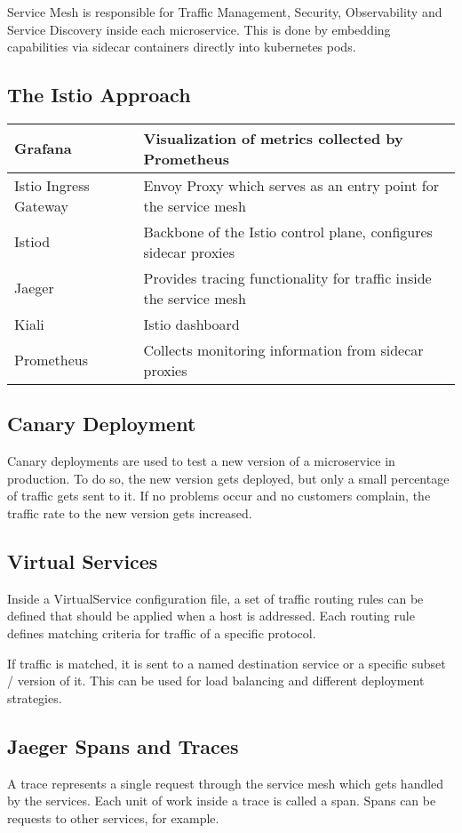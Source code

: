 Service Mesh is responsible for Traffic Management, Security, Observability and Service Discovery inside each microservice.
This is done by embedding capabilities via sidecar containers directly into kubernetes pods.

\subsection{The Istio Approach}
\renewcommand{\arraystretch}{1.5}
\begin{center}
    \begin{tabular}{l|l}
        Grafana & Visualization of metrics collected by Prometheus \\
        \hline
        Istio Ingress Gateway & Envoy Proxy which serves as an entry point for the service mesh \\
        \hline
        Istiod & Backbone of the Istio control plane, configures sidecar proxies \\
        \hline
        Jaeger & Provides tracing functionality for traffic inside the service mesh \\
        \hline
        Kiali & Istio dashboard \\ 
        \hline
        Prometheus & Collects monitoring information from sidecar proxies \\
    \end{tabular}
\end{center}

\subsection{Canary Deployment}
Canary deployments are used to test a new version of a microservice in production. To do so, the new version gets deployed, but only a small percentage of traffic gets sent to it. 
If no problems occur and no customers complain, the traffic rate to the new version gets increased. 

\subsection{Virtual Services}
Inside a VirtualService configuration file, a set of traffic routing rules can be defined that should be applied when a host is addressed. 
Each routing rule defines matching criteria for traffic of a specific protocol.

If traffic is matched, it is sent to a named destination service or a specific subset / version of it. This can be used for load balancing and different deployment strategies.

\subsection{Jaeger Spans and Traces}
A trace represents a single request through the service mesh which gets handled by the services. Each unit of work inside a trace is called a span. Spans can be requests to other services, for example.